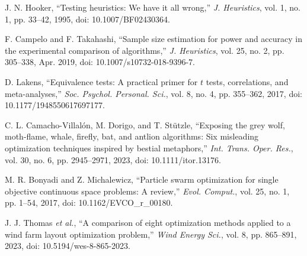 J. N. Hooker, ``Testing heuristics: We have it all wrong,'' \textit{J. Heuristics}, vol. 1, no. 1, pp. 33--42, 1995, doi: 10.1007/BF02430364.

F. Campelo and F. Takahashi, ``Sample size estimation for power and accuracy in the experimental comparison of algorithms,'' \textit{J. Heuristics}, vol. 25, no. 2, pp. 305--338, Apr. 2019, doi: 10.1007/s10732-018-9396-7.

D. Lakens, ``Equivalence tests: A practical primer for $t$ tests, correlations, and meta-analyses,'' \textit{Soc. Psychol. Personal. Sci.}, vol. 8, no. 4, pp. 355--362, 2017, doi: 10.1177/1948550617697177.

C. L. Camacho-Villal\'on, M. Dorigo, and T. St\"utzle, ``Exposing the grey wolf, moth-flame, whale, firefly, bat, and antlion algorithms: Six misleading optimization techniques inspired by bestial metaphors,'' \textit{Int. Trans. Oper. Res.}, vol. 30, no. 6, pp. 2945--2971, 2023, doi: 10.1111/itor.13176.

M. R. Bonyadi and Z. Michalewicz, ``Particle swarm optimization for single objective continuous space problems: A review,'' \textit{Evol. Comput.}, vol. 25, no. 1, pp. 1--54, 2017, doi: 10.1162/EVCO\_r\_00180.

J. J. Thomas \textit{et al.}, ``A comparison of eight optimization methods applied to a wind farm layout optimization problem,'' \textit{Wind Energy Sci.}, vol. 8, pp. 865--891, 2023, doi: 10.5194/wes-8-865-2023.

